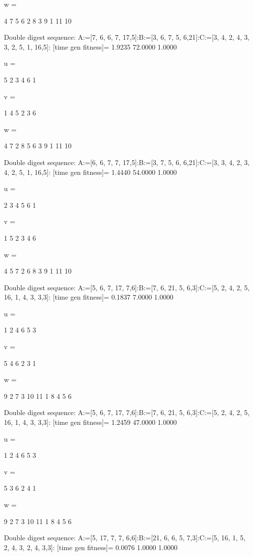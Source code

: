 w =

     4     7     5     6     2     8     3     9     1    11    10

Double digest sequence:
A:=[7, 6, 6, 7, 17,5]:B:=[3, 6, 7, 5, 6,21]:C:=[3, 4, 2, 4, 3, 3, 2, 5, 1, 16,5]:
[time gen fitness]=
    1.9235   72.0000    1.0000


u =

     5     2     3     4     6     1


v =

     1     4     5     2     3     6


w =

     4     7     2     8     5     6     3     9     1    11    10

Double digest sequence:
A:=[6, 6, 7, 7, 17,5]:B:=[3, 7, 5, 6, 6,21]:C:=[3, 3, 4, 2, 3, 4, 2, 5, 1, 16,5]:
[time gen fitness]=
    1.4440   54.0000    1.0000


u =

     2     3     4     5     6     1


v =

     1     5     2     3     4     6


w =

     4     5     7     2     6     8     3     9     1    11    10

Double digest sequence:
A:=[5, 6, 7, 17, 7,6]:B:=[7, 6, 21, 5, 6,3]:C:=[5, 2, 4, 2, 5, 16, 1, 4, 3, 3,3]:
[time gen fitness]=
    0.1837    7.0000    1.0000


u =

     1     2     4     6     5     3


v =

     5     4     6     2     3     1


w =

     9     2     7     3    10    11     1     8     4     5     6

Double digest sequence:
A:=[5, 6, 7, 17, 7,6]:B:=[7, 6, 21, 5, 6,3]:C:=[5, 2, 4, 2, 5, 16, 1, 4, 3, 3,3]:
[time gen fitness]=
    1.2459   47.0000    1.0000


u =

     1     2     4     6     5     3


v =

     5     3     6     2     4     1


w =

     9     2     7     3    10    11     1     8     4     5     6

Double digest sequence:
A:=[5, 17, 7, 7, 6,6]:B:=[21, 6, 6, 5, 7,3]:C:=[5, 16, 1, 5, 2, 4, 3, 2, 4, 3,3]:
[time gen fitness]=
    0.0076    1.0000    1.0000


